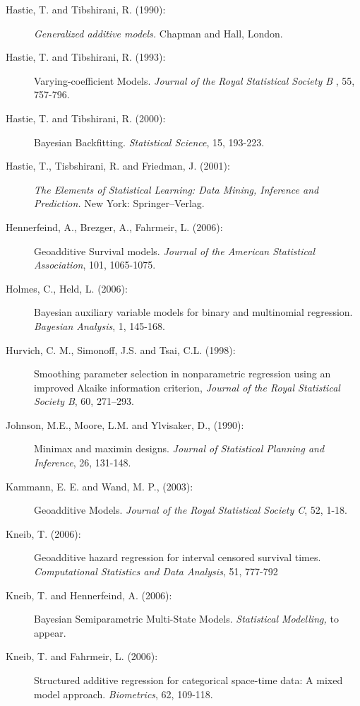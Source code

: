 \documentclass[11pt,a4paper,twoside]{bayesxarticle}
\begin{document}
\begin{description}
\item[Hastie, T. and Tibshirani, R. (1990):] {\em Generalized additive models.} Chapman and
Hall, London.

\item[Hastie, T. and Tibshirani, R. (1993):] Varying-coefficient Models.
{\em Journal of the Royal Statistical Society B} , 55, 757-796.

\item[Hastie, T. and Tibshirani, R. (2000):] Bayesian Backfitting. {\em Statistical Science}, 15, 193-223.

\item[Hastie, T., Tisbshirani, R. and Friedman, J. (2001):] {\em The Elements of Statistical Learning: Data Mining,
Inference and Prediction.} New York: Springer--Verlag.

\item[Hennerfeind, A., Brezger, A., Fahrmeir, L. (2006):]
Geoadditive Survival models. {\em Journal of the American
Statistical Association}, 101, 1065-1075.

\item[Holmes, C., Held, L. (2006):]
Bayesian auxiliary variable models for binary and multinomial
regression. {\em Bayesian Analysis}, 1, 145-168.

\item[Hurvich, C. M., Simonoff, J.S. and Tsai, C.L. (1998):]
Smoothing parameter selection in nonparametric regression using an
                    improved {A}kaike information criterion,
{\it Journal of the Royal Statistical Society B}, 60, 271--293.

\item[Johnson, M.E., Moore, L.M. and
Ylvisaker, D., (1990):] Minimax and maximin designs. {\it Journal of
Statistical Planning and Inference}, 26, 131-148.

\item[Kammann, E. E. and Wand, M. P., (2003):] Geoadditive Models. {\it Journal of the Royal
Statistical Society C}, 52, 1-18.

\item[Kneib, T. (2006):] Geoadditive hazard regression for interval
censored survival times. {\em Computational Statistics and Data
Analysis}, 51, 777-792

\item[Kneib, T. and Hennerfeind, A. (2006):] Bayesian Semiparametric
Multi-State Models. {\em Statistical Modelling,} to appear.


\item[Kneib, T. and Fahrmeir, L. (2006):] Structured additive
regression for categorical space-time data: A mixed model approach.
{\it Biometrics}, 62, 109-118.


\end{description}
\end{document}
